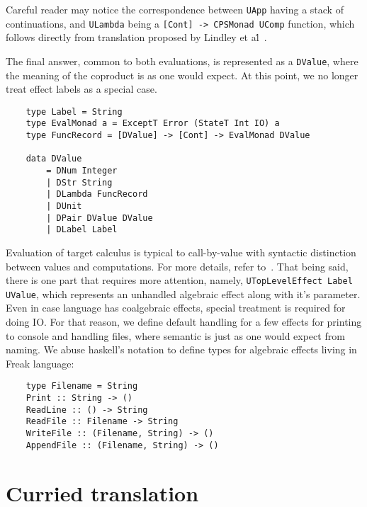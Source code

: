 \documentclass[declaration,shortabstract]{iithesis}
\theoremstyle{definition} \newtheorem{definition}{Definition}[chapter]
\theoremstyle{remark} \newtheorem{remark}[definition]{Observation}
\theoremstyle{plain} \newtheorem{theorem}[definition]{Theorem}
\theoremstyle{plain} \newtheorem{lemma}[definition]{Lemma}
\begin{document}
    \noindent
    Careful reader may notice the correspondence between \verb!UApp! having
    a stack of continuations, and \verb!ULambda! being a
    \verb![Cont] -> CPSMonad UComp! function, which follows directly from
    translation proposed by Lindley et al\.~\cite{handlers-cps-journal}.

    The final answer, common to both evaluations, is represented as a \verb!DValue!,
    where the meaning of the coproduct is as one would expect. At this point,
    we no longer treat effect labels as a special case.

\begin{verbatim}
    type Label = String
    type EvalMonad a = ExceptT Error (StateT Int IO) a
    type FuncRecord = [DValue] -> [Cont] -> EvalMonad DValue

    data DValue
        = DNum Integer
        | DStr String
        | DLambda FuncRecord
        | DUnit
        | DPair DValue DValue
        | DLabel Label
\end{verbatim}

    Evaluation of target calculus is typical to call-by-value with syntactic
    distinction between values and computations. For more details, refer
    to~\cite{handlers-cps-journal}. That being said, there is one part
    that requires more attention, namely, \verb!UTopLevelEffect Label UValue!,
    which represents an unhandled algebraic effect along with it's parameter.
    Even in case language has coalgebraic effects, special treatment is required
    for doing IO\@. For that reason, we define default handling for a few effects
    for printing to console and handling files, where semantic is just as one
    would expect from naming. We abuse haskell's notation to define types for
    algebraic effects living in Freak language:

\begin{verbatim}
    type Filename = String
    Print :: String -> ()
    ReadLine :: () -> String
    ReadFile :: Filename -> String
    WriteFile :: (Filename, String) -> ()
    AppendFile :: (Filename, String) -> ()
\end{verbatim}

    \section{Curried translation}
\end{document}
